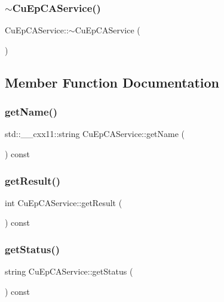 \subsubsection{$\sim$\+Cu\+Ep\+C\+A\+Service()}
{\footnotesize\ttfamily Cu\+Ep\+C\+A\+Service\+::$\sim$\+Cu\+Ep\+C\+A\+Service (\begin{DoxyParamCaption}{ }\end{DoxyParamCaption})\hspace{0.3cm}{\ttfamily [virtual]}}



\subsection{Member Function Documentation}
\mbox{\label{classCuEpCAService_abd0d2b61db9f51c134f95202f29fd458}} 
\subsubsection{get\+Name()}
{\footnotesize\ttfamily std\+::\+\_\+\+\_\+cxx11\+::string Cu\+Ep\+C\+A\+Service\+::get\+Name (\begin{DoxyParamCaption}{ }\end{DoxyParamCaption}) const}

\mbox{\label{classCuEpCAService_aeb8902066b2106726400024072a5b926}} 
\subsubsection{get\+Result()}
{\footnotesize\ttfamily int Cu\+Ep\+C\+A\+Service\+::get\+Result (\begin{DoxyParamCaption}{ }\end{DoxyParamCaption}) const}

\mbox{\label{classCuEpCAService_a16a550d2dd24d730fd424bce8a6210d4}} 
\subsubsection{get\+Status()}
{\footnotesize\ttfamily string Cu\+Ep\+C\+A\+Service\+::get\+Status (\begin{DoxyParamCaption}{ }\end{DoxyParamCaption}) const}

